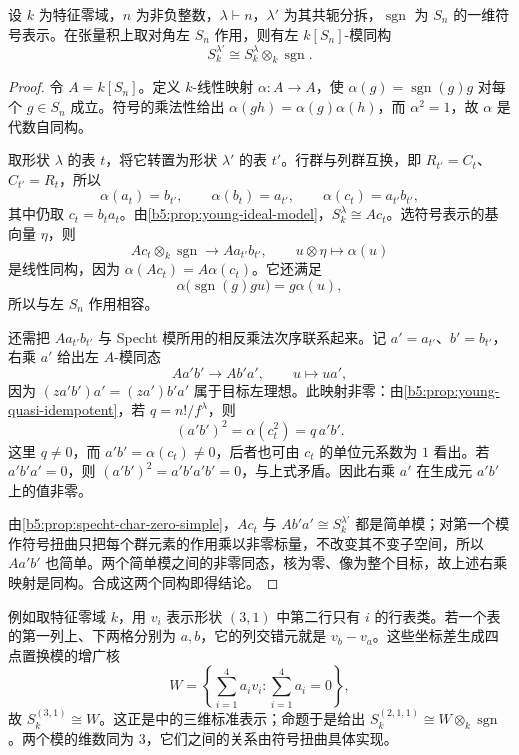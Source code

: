 \begin{proposition}\label{b5:prop:specht-conjugate-sign}
	设 \(k\) 为特征零域，\(n\) 为非负整数，\(\lambda\vdash n\)，\(\lambda'\) 为其共轭分拆，\(\operatorname{sgn}\) 为 \(S_n\) 的一维符号表示。在张量积上取对角左 \(S_n\) 作用，则有左 \(k[S_n]\)-模同构
	\[
		S_k^{\lambda'}\cong S_k^\lambda\otimes_k\operatorname{sgn}.
	\]
\end{proposition}
\begin{proof}
	令 \(A=k[S_n]\)。定义 \(k\)-线性映射 \(\alpha:A\to A\)，使 \(\alpha(g)=\operatorname{sgn}(g)g\) 对每个 \(g\in S_n\) 成立。符号的乘法性给出 \(\alpha(gh)=\alpha(g)\alpha(h)\)，而 \(\alpha^2=1\)，故 \(\alpha\) 是代数自同构。

	取形状 \(\lambda\) 的表 \(t\)，将它转置为形状 \(\lambda'\) 的表 \(t'\)。行群与列群互换，即 \(R_{t'}=C_t\)、\(C_{t'}=R_t\)，所以
	\[
		\alpha(a_t)=b_{t'},\qquad \alpha(b_t)=a_{t'},\qquad \alpha(c_t)=a_{t'}b_{t'},
	\]
	其中仍取 \(c_t=b_ta_t\)。由\cref{b5:prop:young-ideal-model}，\(S_k^\lambda\cong Ac_t\)。选符号表示的基向量 \(\eta\)，则
	\[
		Ac_t\otimes_k\operatorname{sgn}\longrightarrow Aa_{t'}b_{t'}, \qquad u\otimes\eta\longmapsto\alpha(u)
	\]
	是线性同构，因为 \(\alpha(Ac_t)=A\alpha(c_t)\)。它还满足
	\[
		\alpha\bigl(\operatorname{sgn}(g)gu\bigr) =g\alpha(u),
	\]
	所以与左 \(S_n\) 作用相容。

	还需把 \(Aa_{t'}b_{t'}\) 与 Specht 模所用的相反乘法次序联系起来。记 \(a'=a_{t'}\)、\(b'=b_{t'}\)，右乘 \(a'\) 给出左 \(A\)-模同态
	\[
		Aa'b'\longrightarrow Ab'a',\qquad u\longmapsto ua',
	\]
	因为 \((za'b')a'=(za')b'a'\) 属于目标左理想。此映射非零：由\cref{b5:prop:young-quasi-idempotent}，若 \(q=n!/f^\lambda\)，则
	\[
		(a'b')^2=\alpha(c_t^2)=q\,a'b'.
	\]
	这里 \(q\ne0\)，而 \(a'b'=\alpha(c_t)\ne0\)，后者也可由 \(c_t\) 的单位元系数为 \(1\) 看出。若 \(a'b'a'=0\)，则 \((a'b')^2=a'b'a'b'=0\)，与上式矛盾。因此右乘 \(a'\) 在生成元 \(a'b'\) 上的值非零。

	由\cref{b5:prop:specht-char-zero-simple}，\(Ac_t\) 与 \(Ab'a'\cong S_k^{\lambda'}\) 都是简单模；对第一个模作符号扭曲只把每个群元素的作用乘以非零标量，不改变其不变子空间，所以 \(Aa'b'\) 也简单。两个简单模之间的非零同态，核为零、像为整个目标，故上述右乘映射是同构。合成这两个同构即得结论。
\end{proof}

例如取特征零域 \(k\)，用 \(v_i\) 表示形状 \((3,1)\) 中第二行只有 \(i\) 的行表类。若一个表的第一列上、下两格分别为 \(a,b\)，它的列交错元就是 \(v_b-v_a\)。这些坐标差生成四点置换模的增广核
\[
	W=\left\{\sum_{i=1}^4 a_i v_i:\sum_{i=1}^4a_i=0\right\},
\]
故 \(S_k^{(3,1)}\cong W\)。这正是中的三维标准表示；命题于是给出 \(S_k^{(2,1,1)}\cong W\otimes_k\operatorname{sgn}\)。两个模的维数同为 \(3\)，它们之间的关系由符号扭曲具体实现。

